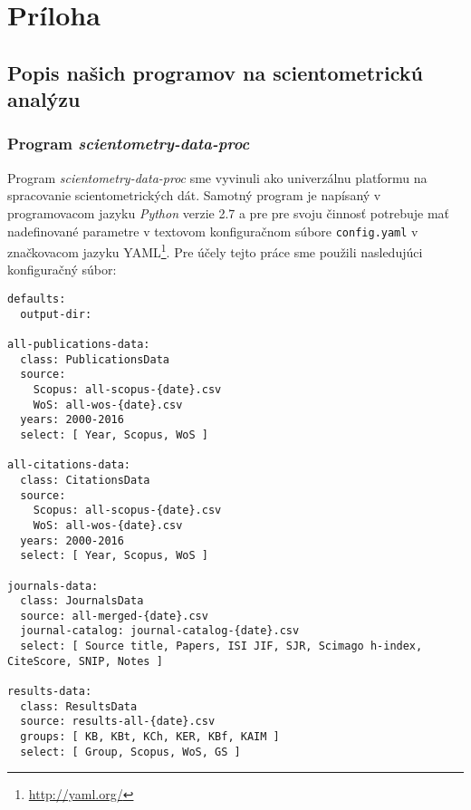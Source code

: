 \chapter*{Príloha}

\section*{Popis našich programov na scientometrickú analýzu}


\subsection*{Program \emph{scientometry-data-proc}}

Program \emph{scientometry-data-proc} sme vyvinuli ako univerzálnu platformu na
spracovanie scientometrických dát.  Samotný program je napísaný v programovacom
jazyku \emph{Python} verzie 2.7 a pre pre svoju činnosť potrebuje mať nadefinované
parametre v textovom konfiguračnom súbore \verb|config.yaml| v značkovacom
jazyku YAML\footnote{\url{http://yaml.org/}}. Pre účely tejto práce sme použili
nasledujúci konfiguračný súbor:

\begin{source}
\begin{verbatim}
defaults:
  output-dir:

all-publications-data:
  class: PublicationsData
  source:
    Scopus: all-scopus-{date}.csv
    WoS: all-wos-{date}.csv
  years: 2000-2016
  select: [ Year, Scopus, WoS ]

all-citations-data:
  class: CitationsData
  source:
    Scopus: all-scopus-{date}.csv
    WoS: all-wos-{date}.csv
  years: 2000-2016
  select: [ Year, Scopus, WoS ]

journals-data:
  class: JournalsData
  source: all-merged-{date}.csv
  journal-catalog: journal-catalog-{date}.csv
  select: [ Source title, Papers, ISI JIF, SJR, Scimago h-index, CiteScore, SNIP, Notes ]

results-data:
  class: ResultsData
  source: results-all-{date}.csv
  groups: [ KB, KBt, KCh, KER, KBf, KAIM ]
  select: [ Group, Scopus, WoS, GS ]
\end{verbatim}
\end{source}

